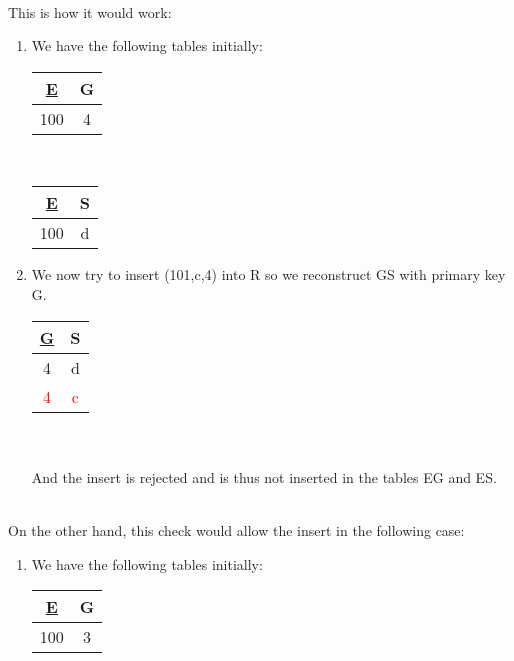 \documentclass[9pt]{article}
\begin{document}
\begin{enumerate}
    \\ This is how it would work:
    \begin{enumerate}
        \item We have the following tables initially:
        \\
        \begin{tabular}{|c|c|} 
            \hline
            \underline{E} & G \\
            \hline
            100 & 4 \\ 
            \hline
        \end{tabular}
        \ \ \ \ \ \ \ \ \ \ \ \ \ \ \ \ 
        \begin{tabular}{|c|c|} 
            \hline
            \underline{E} & S \\
            \hline
            100 & d \\ 
            \hline
        \end{tabular}
        \item We now try to insert (101,c,4) into R so we reconstruct GS with primary key G.
        \\
        \begin{tabular}{|c|c|} 
            \hline
            \underline{G} & S \\
            \hline
            4 & d \\ 
            \textcolor{red}{4} & \textcolor{red}{c} \\
            \hline
        \end{tabular}
        \\\\ And the insert is rejected and is thus not inserted in the tables EG and ES.     
    \end{enumerate}
    \\ On the other hand, this check would allow the insert in the following case:
    \begin{enumerate}
        \item We have the following tables initially:
        \\
        \begin{tabular}{|c|c|} 
            \hline
            \underline{E} & G \\
            \hline
            100 & 3 \\ 
            \hline
        \end{tabular}
        \ \ \ \ \ \ \ \ \ \ \ \ \ \ \ \ 
        \begin{tabular}{|c|c|} 
            \hline

\end{tabular}
\end{enumerate}
\end{enumerate}
\end{document}
